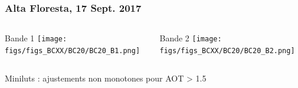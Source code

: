 \documentclass[8pt]{beamer}
\begin{document}
\begin{frame}
\frametitle{Alta Floresta, 17 Sept. 2017}
	
	\begin{columns}
		\begin{column}{0.5\textwidth}
			\begin{center}
				Bande 1
		     	\texttt{[image: figs/figs\_BCXX/BC20/BC20\_B1.png]}
		    \end{center}		
		\end{column}
		\begin{column}{0.5\textwidth}
			\begin{center}
				Bande 2
				\texttt{[image: figs/figs\_BCXX/BC20/BC20\_B2.png]}
		    \end{center}		
		\end{column}
	\end{columns}
	Miniluts : ajustements non monotones pour AOT > 1.5
\end{frame}
\end{document}

